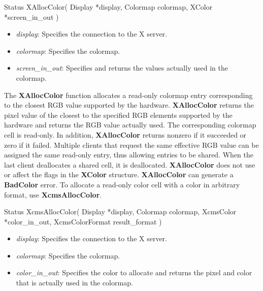 \documentclass{report}
\begin{document}
\begin{itemize}
\begin{cppcode}
                Status XAllocColor(
                    Display *display,
                    Colormap colormap,
                    XColor *screen_in_out
                )
            \end{cppcode}
            \begin{itemize}
                \item \textit{display}: Specifies the connection to the X server.
                \item \textit{colormap}: Specifies the colormap.
                \item \textit{screen\_in\_out}: Specifies and returns the values actually used in the colormap.
            \end{itemize}
            \noindent
            The \textbf{XAllocColor} function allocates a read-only colormap entry corresponding to the closest RGB value supported by the hardware. \textbf{XAllocColor} returns the pixel value of the closest to the specified RGB elements supported by the hardware and returns the RGB value actually used. The corresponding colormap cell is read-only. In addition, \textbf{XAllocColor} returns nonzero if it succeeded or zero if it failed. Multiple clients that request the same effective RGB value can be assigned the same read-only entry, thus allowing entries to be shared. When the last client deallocates a shared cell, it is deallocated. \textbf{XAllocColor} does not use or affect the flags in the \textbf{XColor} structure.
            \bigbreak \noindent
            \textbf{XAllocColor} can generate a \textbf{BadColor} error.
            \bigbreak \noindent
            To allocate a read-only color cell with a color in arbitrary format, use \textbf{XcmsAllocColor}.
            \bigbreak \noindent
            \begin{cppcode}
                Status XcmsAllocColor(
                    Display *display,
                    Colormap colormap,
                    XcmsColor *color_in_out,
                    XcmsColorFormat result_format
                )
            \end{cppcode}
            \begin{itemize}
                \item \textit{display}: Specifies the connection to the X server.
                \item \textit{colormap}: Specifies the colormap.
                \item \textit{color\_in\_out}: Specifies the color to allocate and returns the pixel and color that is actually used in the colormap.

\end{itemize}
\end{itemize}
\end{document}
